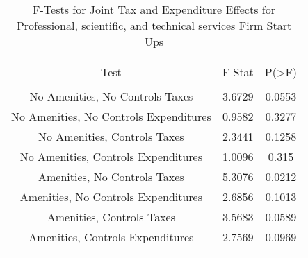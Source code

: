 
\begin{table}[!htbp] \centering 
  \caption{F-Tests for Joint Tax and Expenditure Effects for Professional, scientific, and technical services Firm Start Ups} 
  \label{54Ftests} 
\begin{tabular}{@{\extracolsep{5pt}} ccc} 
\\[-1.8ex]\hline 
\hline \\[-1.8ex] 
Test & F-Stat & P(\textgreater F) \\ 
\hline \\[-1.8ex] 
No Amenities, No Controls Taxes & 3.6729 & 0.0553 \\ 
No Amenities, No Controls Expenditures & 0.9582 & 0.3277 \\ 
No Amenities, Controls Taxes & 2.3441 & 0.1258 \\ 
No Amenities, Controls Expenditures & 1.0096 & 0.315 \\ 
Amenities, No Controls Taxes & 5.3076 & 0.0212 \\ 
Amenities, No Controls Expenditures & 2.6856 & 0.1013 \\ 
Amenities, Controls Taxes & 3.5683 & 0.0589 \\ 
Amenities, Controls Expenditures & 2.7569 & 0.0969 \\ 
\hline \\[-1.8ex] 
\end{tabular} 
\end{table} 
